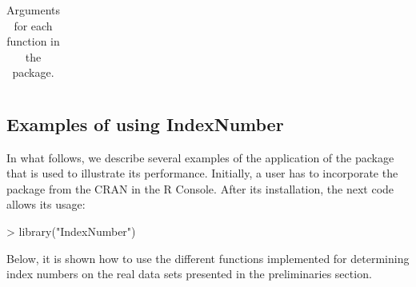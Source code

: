 \begin{table}[h]
\begin{center}
{\begin{tabular}{lccccccc}
%				
				\bottomrule
		\end{tabular}}\vspace{-2 mm}\end{center}\caption{Arguments for each function in the  package.}\label{table3}\end{table}


\subsection{Examples of using IndexNumber}
In what follows, we describe several examples of the application of the  package that is used to illustrate its performance. Initially,  a  user has to incorporate the package from the CRAN in the R Console. After its installation, the next code allows its usage:
\begin{example}
> library("IndexNumber")
\end{example}
Below, it is shown how to use the different functions implemented for determining index numbers on the real data sets presented in the preliminaries section.

